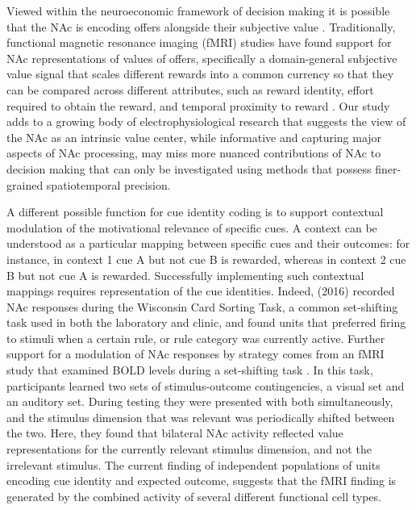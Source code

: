 \documentclass[11pt]{article}
\let\cite=\citep
\begin{document}
Viewed within the neuroeconomic framework of decision making it is possible that the NAc is encoding offers alongside their subjective value \cite{Samuelson1947}. Traditionally, functional magnetic resonance imaging (fMRI) studies have found support for NAc representations of values of offers, specifically a domain-general subjective value signal that scales different rewards into a common currency so that they can be compared across different attributes, such as reward identity, effort required to obtain the reward, and temporal proximity to reward \cite{Peters2009,Levy2012,Bartra2013,Sescousse2015}. Our study adds to a growing body of electrophysiological research that suggests the view of the NAc as an intrinsic value center, while informative and capturing major aspects of NAc processing, may miss more nuanced contributions of NAc to decision making that can only be investigated using methods that possess finer-grained spatiotemporal precision.

A different possible function for cue identity coding is to support
contextual modulation of the motivational relevance of specific
cues. A context can be understood as a particular mapping between
specific cues and their outcomes: for instance, in context 1 cue A but
not cue B is rewarded, whereas in context 2 cue B but not cue A is
rewarded. Successfully implementing such contextual mappings requires
representation of the cue identities. Indeed, \citeauthor{Sleezer2016} (2016)
recorded NAc responses during the Wisconsin Card Sorting Task,
a common set-shifting task used in both the laboratory and clinic, and
found units that preferred firing to stimuli when a certain rule, or
rule category was currently active. Further support for a
modulation of NAc responses by strategy comes from an fMRI study that
examined BOLD levels during a set-shifting task
\cite{Fitzgerald2014}. In this task, participants learned two sets of
stimulus-outcome contingencies, a visual set and an auditory set. During
testing they were presented with both simultaneously, and the stimulus
dimension that was relevant was periodically shifted between the
two. Here, they found that bilateral NAc activity reflected value
representations for the currently relevant stimulus dimension, and not
the irrelevant stimulus. The current finding of independent populations of units encoding cue identity and expected
outcome, suggests that the fMRI finding is generated by the combined
activity of several different functional cell types.
\end{document}
